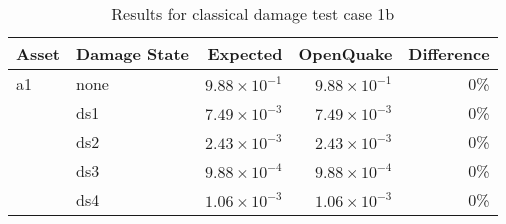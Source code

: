 \begin{table}[htbp]

\centering
\begin{tabular}{ l l r r r }

\hline
\rowcolor{anti-flashwhite}
\bf{Asset} & \bf{Damage State} & \bf{Expected} & \bf{OpenQuake} & \bf{Difference}\\
\hline
a1 & none & $9.88 \times 10^{-1}$ & $9.88 \times 10^{-1}$ & 0\% \\
   & ds1 & $7.49 \times 10^{-3}$ & $7.49 \times 10^{-3}$ & 0\% \\
   & ds2 & $2.43 \times 10^{-3}$ & $2.43 \times 10^{-3}$ & 0\% \\
   & ds3 & $9.88 \times 10^{-4}$ & $9.88 \times 10^{-4}$ & 0\% \\
   & ds4 & $1.06 \times 10^{-3}$ & $1.06 \times 10^{-3}$ & 0\% \\
\hline
\end{tabular}

\caption{Results for classical damage test case 1b}
\label{tab:result-cd-1b}
\end{table}